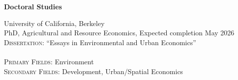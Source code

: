 \documentclass[10pt, oneside]{article}
\begin{document}
\begin{minipage}[t]{0.1\linewidth}
\textbf{Doctoral Studies}
\end{minipage}\hspace{0.05\linewidth}
\begin{minipage}[t]{0.8\linewidth}
University of California, Berkeley\\
PhD, Agricultural and Resource Economics, Expected completion May 2026 \\
\textsc{Dissertation:}  ``Essays in Environmental and Urban Economics'' \\ 
~\\ 
\textsc{Primary Fields:} Environment \\
\textsc{Secondary Fields:} Development, Urban/Spatial Economics \\
\vspace{0.3cm} 


\end{minipage}
\end{document}
